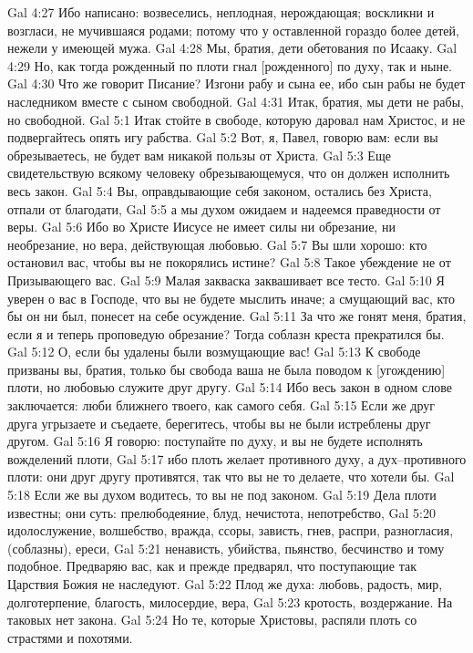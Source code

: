 Gal 4:27  Ибо написано: возвеселись, неплодная, нерождающая; воскликни и возгласи, не мучившаяся родами; потому что у оставленной гораздо более детей, нежели у имеющей мужа.
Gal 4:28  Мы, братия, дети обетования по Исааку.
Gal 4:29  Но, как тогда рожденный по плоти гнал [рожденного] по духу, так и ныне.
Gal 4:30  Что же говорит Писание? Изгони рабу и сына ее, ибо сын рабы не будет наследником вместе с сыном свободной.
Gal 4:31  Итак, братия, мы дети не рабы, но свободной.
Gal 5:1  Итак стойте в свободе, которую даровал нам Христос, и не подвергайтесь опять игу рабства.
Gal 5:2  Вот, я, Павел, говорю вам: если вы обрезываетесь, не будет вам никакой пользы от Христа.
Gal 5:3  Еще свидетельствую всякому человеку обрезывающемуся, что он должен исполнить весь закон.
Gal 5:4  Вы, оправдывающие себя законом, остались без Христа, отпали от благодати,
Gal 5:5  а мы духом ожидаем и надеемся праведности от веры.
Gal 5:6  Ибо во Христе Иисусе не имеет силы ни обрезание, ни необрезание, но вера, действующая любовью.
Gal 5:7  Вы шли хорошо: кто остановил вас, чтобы вы не покорялись истине?
Gal 5:8  Такое убеждение не от Призывающего вас.
Gal 5:9  Малая закваска заквашивает все тесто.
Gal 5:10  Я уверен о вас в Господе, что вы не будете мыслить иначе; а смущающий вас, кто бы он ни был, понесет на себе осуждение.
Gal 5:11  За что же гонят меня, братия, если я и теперь проповедую обрезание? Тогда соблазн креста прекратился бы.
Gal 5:12  О, если бы удалены были возмущающие вас!
Gal 5:13  К свободе призваны вы, братия, только бы свобода ваша не была поводом к [угождению] плоти, но любовью служите друг другу.
Gal 5:14  Ибо весь закон в одном слове заключается: люби ближнего твоего, как самого себя.
Gal 5:15  Если же друг друга угрызаете и съедаете, берегитесь, чтобы вы не были истреблены друг другом.
Gal 5:16  Я говорю: поступайте по духу, и вы не будете исполнять вожделений плоти,
Gal 5:17  ибо плоть желает противного духу, а дух--противного плоти: они друг другу противятся, так что вы не то делаете, что хотели бы.
Gal 5:18  Если же вы духом водитесь, то вы не под законом.
Gal 5:19  Дела плоти известны; они суть: прелюбодеяние, блуд, нечистота, непотребство,
Gal 5:20  идолослужение, волшебство, вражда, ссоры, зависть, гнев, распри, разногласия, (соблазны), ереси,
Gal 5:21  ненависть, убийства, пьянство, бесчинство и тому подобное. Предваряю вас, как и прежде предварял, что поступающие так Царствия Божия не наследуют.
Gal 5:22  Плод же духа: любовь, радость, мир, долготерпение, благость, милосердие, вера,
Gal 5:23  кротость, воздержание. На таковых нет закона.
Gal 5:24  Но те, которые Христовы, распяли плоть со страстями и похотями.
